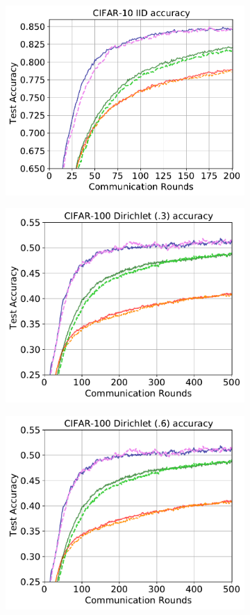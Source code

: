 \documentclass{article} %
\begin{document}
\begin{figure}[ht!]
\begin{subfigure}{.5\textwidth}
  \label{fig:sub22}
\end{subfigure}
\begin{subfigure}{.5\textwidth}
  \centering
  \includegraphics[width=.8\linewidth]{100perfig/cifar10_iid.pdf}
  \label{fig:sub23}
\end{subfigure}
\begin{subfigure}{.5\textwidth}
  \centering
  \includegraphics[width=.8\linewidth]{100perfig/cifar100_0.3.pdf}
  \label{fig:sub24}
\end{subfigure}
\begin{subfigure}{.5\textwidth}
  \centering
  \includegraphics[width=.8\linewidth]{100perfig/cifar100_0.6.pdf}

\end{subfigure}
\end{figure}
\end{document}
